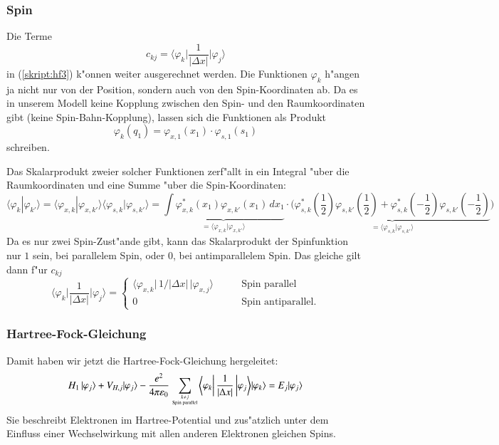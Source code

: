 \subsubsection{Spin}
Die Terme
\[
c_{kj}
=
\biggl\langle\varphi_k\biggl|
\frac{1}{|\Delta x|}
\biggr|\varphi_j\biggr\rangle
\]
in (\ref{skript:hf3})  k"onnen weiter ausgerechnet werden.
Die Funktionen $\varphi_k$ h"angen ja nicht nur von der Position, sondern
auch von den Spin-Koordinaten ab.
Da es in unserem Modell keine Kopplung zwischen den Spin- und
den Raumkoordinaten gibt (keine Spin-Bahn-Kopplung), lassen sich die
Funktionen als Produkt
\[
\varphi_k(q_1)=\varphi_{x,1}(x_1)\cdot\varphi_{s,1}(s_1)
\]
schreiben.

Das Skalarprodukt zweier solcher Funktionen zerf"allt in ein Integral
"uber die Raumkoordinaten und eine Summe "uber die Spin-Koordinaten:
\[
\langle\varphi_k|\varphi_{k'}\rangle
=
\langle\varphi_{x,k}|\varphi_{x,k'}\rangle
\langle\varphi_{s,k}|\varphi_{s,k'}\rangle
=
\underbrace{
\int\varphi_{x,k}^*(x_1)\varphi_{x,k'}(x_1)\,dx_1
}_{=\langle\varphi_{x,k}|\varphi_{x,k'}\rangle}
\cdot
\big(
\underbrace{
\varphi_{s,k}^*(\textstyle \frac12) \varphi_{s,k'}(\textstyle \frac12)
+
\varphi_{s,k}^*(\textstyle-\frac12) \varphi_{s,k'}(\textstyle-\frac12)
}_{=\langle\varphi_{s,k}|\varphi_{s,k'}\rangle}
\big)
\]
Da es nur zwei Spin-Zust"ande gibt, kann das Skalarprodukt der Spinfunktion
nur $1$ sein, bei parallelem Spin, oder $0$, bei antimparallelem Spin.
Das gleiche gilt dann f"ur  $c_{kj}$
\[
\biggl\langle\varphi_k\biggl|
\frac{1}{|\Delta x|}
\biggr|\varphi_j\biggr\rangle
=
\begin{cases}
\langle\varphi_{x,k}|\, 1/|\Delta x|\,|\varphi_{x,j}\rangle
&\qquad\text{Spin parallel}
\\
0&\qquad\text{Spin antiparallel}.
\end{cases}
\]

\subsubsection{Hartree-Fock-Gleichung}
Damit haben wir jetzt die Hartree-Fock-Gleichung hergeleitet:
\begin{align}
H_1\,|\varphi_j\rangle
+
V_{H,j}
|\varphi_j\rangle
-
\frac{e^2}{4\pi\varepsilon_0}
\sum_{{k\ne j}\atop{\text{Spin parallel}}}
\biggl\langle\varphi_k\biggl|\,
\frac{1}{|\Delta x|}
\,\biggr|\varphi_j\biggr\rangle
|\varphi_k\rangle
=
E_j
| \varphi_j\rangle
\label{skript:hf4}
\end{align}
Sie beschreibt Elektronen im Hartree-Potential und zus"atzlich unter
dem Einfluss einer Wechselwirkung mit allen anderen Elektronen
gleichen Spins.



